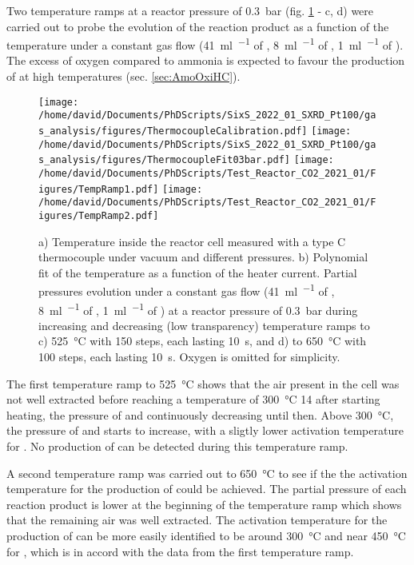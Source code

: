 Two temperature ramps at a reactor pressure of \qty{0.3}{\bar} (fig. \ref{fig:TempRamps} - c, d) were carried out to probe the evolution of the reaction product as a function of the temperature under a constant gas flow (\qty{41}{\ml\per\min} of \argon, \qty{8}{\ml\per\min} of \dioxygen, \qty{1}{\ml\per\min} of \ammonia).
The excess of oxygen compared to ammonia is expected to favour the production of \nitricoxide at high temperatures (sec. \ref{sec:AmoOxiHC}).

\begin{figure}[!htb]
    \centering
    \texttt{[image: /home/david/Documents/PhDScripts/SixS\_2022\_01\_SXRD\_Pt100/gas\_analysis/figures/ThermocoupleCalibration.pdf]}
    \texttt{[image: /home/david/Documents/PhDScripts/SixS\_2022\_01\_SXRD\_Pt100/gas\_analysis/figures/ThermocoupleFit03bar.pdf]}
    \texttt{[image: /home/david/Documents/PhDScripts/Test\_Reactor\_CO2\_2021\_01/Figures/TempRamp1.pdf]}
    \texttt{[image: /home/david/Documents/PhDScripts/Test\_Reactor\_CO2\_2021\_01/Figures/TempRamp2.pdf]}
    \caption{
        a) Temperature inside the reactor cell measured with a type C thermocouple under vacuum and different \argon pressures.
        b) Polynomial fit of the temperature as a function of the heater current.
        Partial pressures evolution under a constant gas flow (\qty{41}{\ml\per\min} of \argon, \qty{8}{\ml\per\min} of \dioxygen, \qty{1}{\ml\per\min} of \ammonia) at a reactor pressure of \qty{0.3}{\bar} during increasing and decreasing (low transparency) temperature ramps to c) \qty{525}{\degreeCelsius} with 150 steps, each lasting \qty{10}{\second}, and d) to \qty{650}{\degreeCelsius} with 100 steps, each lasting \qty{10}{\second}.
        Oxygen is omitted for simplicity.
    }
    \label{fig:TempRamps}
\end{figure}

The first temperature ramp to \qty{525}{\degreeCelsius} shows that the air present in the cell was not well extracted before reaching a temperature of \qty{300}{\degreeCelsius} \qty{14}{\min} after starting heating, the pressure of \nitrogen and \water continuously decreasing until then.
Above \qty{300}{\degreeCelsius}, the pressure of \nitrogen and \nitricoxide starts to increase, with a sligtly lower activation temperature for \nitrogen.
No production of \nitrousoxide can be detected during this temperature ramp.

A second temperature ramp was carried out to \qty{650}{\degreeCelsius} to see if the the activation temperature for the production of \nitrousoxide could be achieved.
The partial pressure of each reaction product is lower at the beginning of the temperature ramp which shows that the remaining air was well extracted.
The activation temperature for the production of \nitrogen can be more easily identified to be around \qty{300}{\degreeCelsius} and near \qty{450}{\degreeCelsius} for \nitricoxide, which is in accord with the data from the first temperature ramp.

